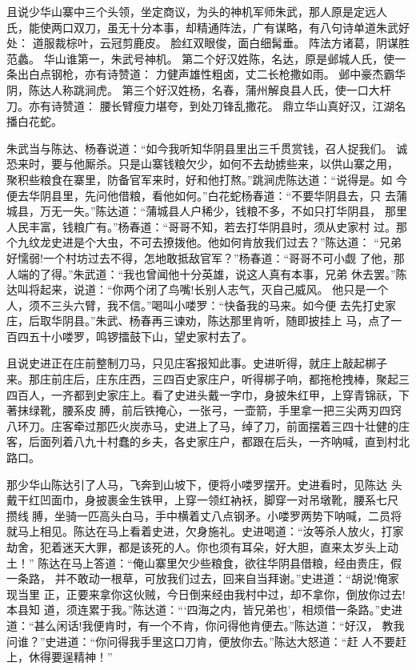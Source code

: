 且说少华山寨中三个头领，坐定商议，为头的神机军师朱武，那人原是定远人
氏，能使两口双刀，虽无十分本事，却精通阵法，广有谋略，有八句诗单道朱武好
处：
道服裁棕叶，云冠剪鹿皮。
脸红双眼俊，面白细髯垂。
阵法方诸葛，阴谋胜范蠡。
华山谁第一，朱武号神机。
第二个好汉姓陈，名达，原是邺城人氏，使一条出白点钢枪，亦有诗赞道：
力健声雄性粗卤，丈二长枪撒如雨。
邺中豪杰霸华阴，陈达人称跳涧虎。
第三个好汉姓杨，名春，蒲州解良县人氏，使一口大杆刀。亦有诗赞道：
腰长臂瘦力堪夸，到处刀锋乱撒花。
鼎立华山真好汉，江湖名播白花蛇。

朱武当与陈达、杨春说道：“如今我听知华阴县里出三千贯赏钱，召人捉我们。
诚恐来时，要与他厮杀。只是山寨钱粮欠少，如何不去劫掳些来，以供山寨之用，
聚积些粮食在寨里，防备官军来时，好和他打熬。”跳涧虎陈达道：“说得是。如
今便去华阴县里，先问他借粮，看他如何。”白花蛇杨春道：“不要华阴县去，只
去蒲城县，万无一失。”陈达道：“蒲城县人户稀少，钱粮不多，不如只打华阴县，
那里人民丰富，钱粮广有。”杨春道：“哥哥不知，若去打华阴县时，须从史家村
过。那个九纹龙史进是个大虫，不可去撩拨他。他如何肯放我们过去？”陈达道：
“兄弟好懦弱!一个村坊过去不得，怎地敢抵敌官军？”杨春道：“哥哥不可小觑
了他，那人端的了得。”朱武道：“我也曾闻他十分英雄，说这人真有本事，兄弟
休去罢。”陈达叫将起来，说道：“你两个闭了鸟嘴!长别人志气，灭自己威风。
他只是一个人，须不三头六臂，我不信。”喝叫小喽罗：“快备我的马来。如今便
去先打史家庄，后取华阴县。”朱武、杨春再三谏劝，陈达那里肯听，随即披挂上
马，点了一百四五十小喽罗，鸣锣擂鼓下山，望史家村去了。

且说史进正在庄前整制刀马，只见庄客报知此事。史进听得，就庄上敲起梆子
来。那庄前庄后，庄东庄西，三四百史家庄户，听得梆子响，都拖枪拽棒，聚起三
四百人，一齐都到史家庄上。看了史进头戴一字巾，身披朱红甲，上穿青锦祆，下
著抹绿靴，腰系皮膊，前后铁掩心，一张弓，一壶箭，手里拿一把三尖两刃四窍
八环刀。庄客牵过那匹火炭赤马，史进上了马，绰了刀，前面摆着三四十壮健的庄
客，后面列着八九十村蠢的乡夫，各史家庄户，都跟在后头，一齐呐喊，直到村北
路口。

那少华山陈达引了人马，飞奔到山坡下，便将小喽罗摆开。史进看时，见陈达
头戴干红凹面巾，身披裹金生铁甲，上穿一领红衲袄，脚穿一对吊墩靴，腰系七尺
攒线膊，坐骑一匹高头白马，手中横着丈八点钢矛。小喽罗两势下呐喊，二员将
就马上相见。陈达在马上看着史进，欠身施礼。史进喝道：“汝等杀人放火，打家
劫舍，犯着迷天大罪，都是该死的人。你也须有耳朵，好大胆，直来太岁头上动土！”
陈达在马上答道：“俺山寨里欠少些粮食，欲往华阴县借粮，经由贵庄，假一条路，
并不敢动一根草，可放我们过去，回来自当拜谢。”史进道：“胡说!俺家现当里
正，正要来拿你这伙贼，今日倒来经由我村中过，却不拿你，倒放你过去!本县知
道，须连累于我。”陈达道：“‘四海之内，皆兄弟也’，相烦借一条路。”史进
道：“甚么闲话!我便肯时，有一个不肯，你问得他肯便去。”陈达道：“好汉，
教我问谁？”史进道：“你问得我手里这口刀肯，便放你去。”陈达大怒道：“赶
人不要赶上，休得要逞精神！”

